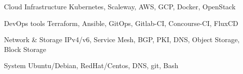   \cvskill
    {Cloud Infrastructure}
    {Kubernetes, Scaleway, AWS, GCP, Docker, OpenStack}

  \cvskill
    {DevOps tools}
    {Terraform, Ansible, GitOps, Gitlab-CI, Concourse-CI, FluxCD}

  \cvskill
    {Network \& Storage}
    {IPv4/v6, Service Mesh, BGP, PKI, DNS, Object Storage, Block
    Storage}

  \cvskill
    {System}
    {Ubuntu/Debian, RedHat/Centos, DNS, git, Bash}
